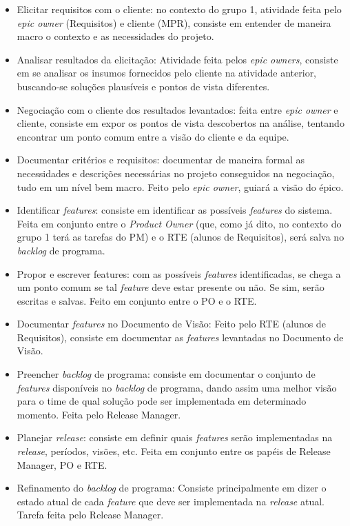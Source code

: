 \begin{itemize}
  \item Elicitar requisitos com o cliente: no contexto do grupo 1, atividade feita pelo \emph{epic owner} (Requisitos) e cliente (MPR), consiste em entender de maneira macro o contexto e as necessidades do projeto.
  \item Analisar resultados da elicitação: Atividade feita pelos \emph{epic owners}, consiste em se analisar os insumos fornecidos pelo cliente na atividade anterior, buscando-se soluções plausíveis e pontos de vista diferentes.
  \item Negociação com o cliente dos resultados levantados: feita entre \emph{epic owner} e cliente, consiste em expor os pontos de vista descobertos na análise, tentando encontrar um ponto comum entre a visão do cliente e da equipe.
  \item Documentar critérios e requisitos: documentar de maneira formal as necessidades e descrições necessárias no projeto conseguidos na negociação, tudo em um nível bem macro. Feito pelo \emph{epic owner}, guiará a visão do épico.
  \item Identificar \emph{features}: consiste em identificar as possíveis \emph{features} do sistema. Feita em conjunto entre o \emph{Product Owner} (que, como já dito, no contexto do grupo 1 terá as tarefas do PM) e o RTE (alunos de Requisitos), será salva no \emph{backlog} de programa.
  \item Propor e escrever features: com as possíveis \emph{features} identificadas, se chega a um ponto comum se tal \emph{feature} deve estar presente ou não. Se sim, serão escritas e salvas. Feito em conjunto entre o PO e o RTE.
  \item Documentar \emph{features} no Documento de Visão: Feito pelo RTE (alunos de Requisitos), consiste em documentar as \emph{features} levantadas no Documento de Visão.
  \item Preencher \emph{backlog} de programa: consiste em documentar o conjunto de \emph{features} disponíveis no \emph{backlog} de programa, dando assim uma melhor visão para o time de qual solução pode ser implementada em determinado momento. Feita pelo Release Manager.
  \item Planejar \emph{release}: consiste em definir quais \emph{features} serão implementadas na \emph{release}, períodos, visões, etc. Feita em conjunto entre os papéis de Release Manager, PO e RTE.
  \item Refinamento do \emph{backlog} de programa: Consiste principalmente em dizer o estado atual de cada \emph{feature} que deve ser implementada na \emph{release} atual. Tarefa feita pelo Release Manager.

\end{itemize}
